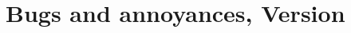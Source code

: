 \documentclass{article}
\begin{document}
\section*{Bugs and annoyances, Version~\VERSION}


\end{document}
